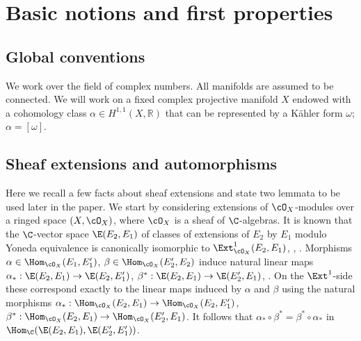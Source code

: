 \section{Basic notions and first properties}\label{sect:prelim}

\subsection{Global conventions}
We work over the field of complex numbers. All manifolds are assumed to be connected. We will work on a fixed complex projective manifold $X$ endowed with a cohomology class $\alpha \in H^{1,1}(X, \mathbb{R})$ that can be represented by a Kähler form $\omega$; \ie $\alpha = [\omega]$.

\subsection{Sheaf extensions and automorphisms}\label{subsect:sheafextensions}
Here we recall a few facts about sheaf extensions and state two lemmata to be used later in the paper.
We start by considering extensions of $\cO_X$-modules over a ringed space $(X,\cO_X)$, where $\cO_X$ is a sheaf of $\C$-algebras. It is known that the $\C$-vector space $\E(E_2,E_1)$ of classes of extensions of $E_2$ by $E_1$ modulo Yoneda equivalence is canonically isomorphic to $\Ext^1_{\cO_X}(E_2,E_1)$, \cf \cite[Exer.\,III.6.1]{Hartshorne}, \cite[Exer.\,A3.26]{Eisenbud_CommAlg}.
Morphisms $\alpha\in \Hom_{\cO_X}(E_1,E'_1)$, $\beta\in\Hom_{\cO_X}(E'_2,E_2)$ induce natural linear maps
$\alpha_*:\E(E_2,E_1)\to\E(E_2,E'_1)$,
$\beta^*:\E(E_2,E_1)\to\E(E'_2,E_1)$, \cf \cite[Exer.\,A3.26]{Eisenbud_CommAlg}. On the $\Ext^1$-side these correspond exactly to the linear maps induced by $\alpha$ and $\beta$ using the natural morphisms $\alpha_*:\Hom_{\cO_X}(E_2,E_1)\to\Hom_{\cO_X}(E_2,E'_1)$, $\beta^*:\Hom_{\cO_X}(E_2,E_1)\to\Hom_{\cO_X}(E'_2,E_1)$. It follows that $\alpha_*\circ\beta^*=\beta^*\circ\alpha_*$ in $\Hom_\C(\E(E_2,E_1),\E(E'_2,E'_1))$.

